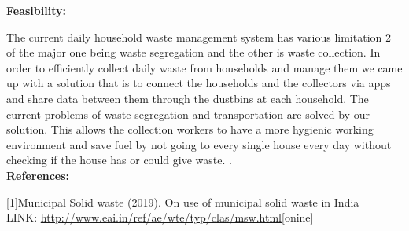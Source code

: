 \textup{\huge {\bf Feasibility: } \\[0.01in] }


\large {The current daily household waste management system has various limitation 2 of the major one being waste segregation and the other is waste collection.
	In order to efficiently collect daily waste from households and manage them we came up with a solution that is to connect the households and the collectors via apps and share data between them through the dustbins at each household. 
	The current problems of waste segregation and transportation are solved by our solution. This allows the collection workers to have a more hygienic working environment and save fuel by not going to every single house every day without checking if the house has or could give waste.
	.}\\[0.1in]

\textup{\huge {\bf References: } \\[0.01in] }

\large { [1]Municipal Solid waste (2019). On use of municipal solid waste in India
}\\[0.1in]
\large{LINK: \url{http://www.eai.in/ref/ae/wte/typ/clas/msw.html}[onine]}